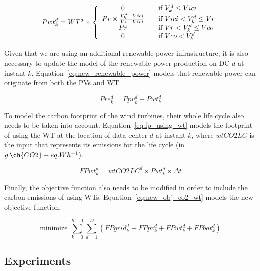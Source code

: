 \begin{equation} \label{eq:wt_power_prod}
Pwt^d_{k} = WT^d \times \left\{ 
  \begin{array}{ c l }
    0   & \quad \textrm{if } V^d_k \leq Vici \\
    Pr \times \frac{V^d_k - Vici}{Vr - Vici}  & \quad \textrm{if } Vici < V^d_k \leq Vr \\
    Pr  & \quad \textrm{if } Vr < V^d_k \leq Vco \\
    0  & \quad \textrm{if } Vco < V^d_k \\
  \end{array}
\right.
\end{equation}


Given that we are using an additional renewable power infrastructure, it is also necessary to update the model of the renewable power production on DC $d$ at instant $k$. Equation~\eqref{eq:new_renewable_power} models that renewable power can originate from both the PVs and WT.

\begin{equation} \label{eq:new_renewable_power}
    Pre^d_{k}= Ppv^d_{k} + Pwt^d_{k}
\end{equation}


To model the carbon footprint of the wind turbines, their whole life cycle also needs to be taken into account. Equation~\eqref{eq:fp_using_wt} models the footprint of using the WT at the location of data center $d$ at instant $k$, where $wtCO2LC$ is the input that represents its emissions for the life cycle (in $g\,\ch{CO2}-eq.Wh^{-1}$).

\begin{equation}\label{eq:fp_using_wt}
   FPwt^d_k =  wtCO2LC^d \times Pwt^d_{k}\times \Delta t
\end{equation}

Finally, the objective function also needs to be modified in order to include the carbon emissions of using WTs. Equation~\ref{eq:new_obj_co2_wt} models the new objective function.

\begin{equation} \label{eq:new_obj_co2_wt}
  \text{minimize }\sum_{k=0}^{K-1} \sum_{d=1}^D (FPgrid^d_k +  FPpv^d_k +  FPwt^d_k + FPbat^d_k) 
\end{equation}

\subsection{Experiments}

